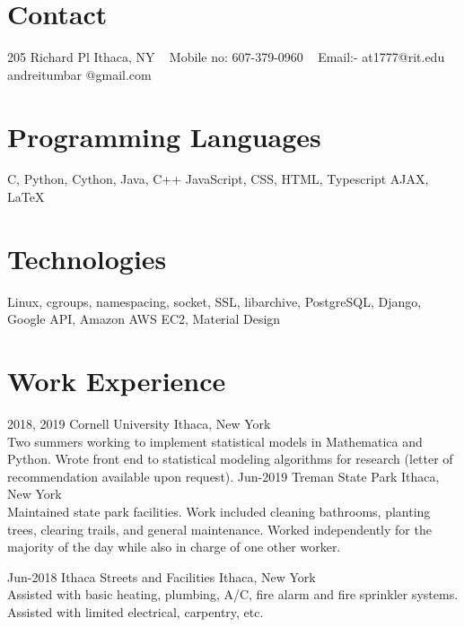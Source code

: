 \documentclass[print]{cv-style}          %
\begin{document}


\begin{aside}
%
\section{Contact}
205 Richard Pl 
Ithaca, NY
~
Mobile no:
607-379-0960
~
Email:-
at1777@rit.edu
andreitumbar
@gmail.com
%
%
\section{Programming
   Languages}
C, Python, Cython,
Java, C++ JavaScript,
CSS, HTML, Typescript
AJAX, \LaTeX{}
%
%
\section{Technologies}
Linux, cgroups,
namespacing, socket,
SSL, libarchive,
PostgreSQL, Django,
Google API, Amazon AWS EC2,
Material Design
%
\end{aside}



\section{Work Experience}

\begin{entrylist}
\entry
  {2018, 2019}
  {Cornell University}
  {Ithaca, New York}
  {\\
  Two summers working to implement statistical models in Mathematica and Python. Wrote front end to statistical modeling algorithms for research (letter of recommendation available upon request).}
\entry
  {Jun-2019}
  {Treman State Park}
  {Ithaca, New York}
  {\\
Maintained state park facilities. Work included cleaning bathrooms, planting trees, clearing trails, and general maintenance. Worked independently for the majority of the day while also in charge of one other worker.
  }

\entry
  {Jun-2018}
  {Ithaca Streets and Facilities}
  {Ithaca, New York}
  {\\
Assisted with basic heating, plumbing, A/C, fire alarm and fire sprinkler systems. Assisted with limited electrical, carpentry, etc.
  }


\end{entrylist}
\end{document}
